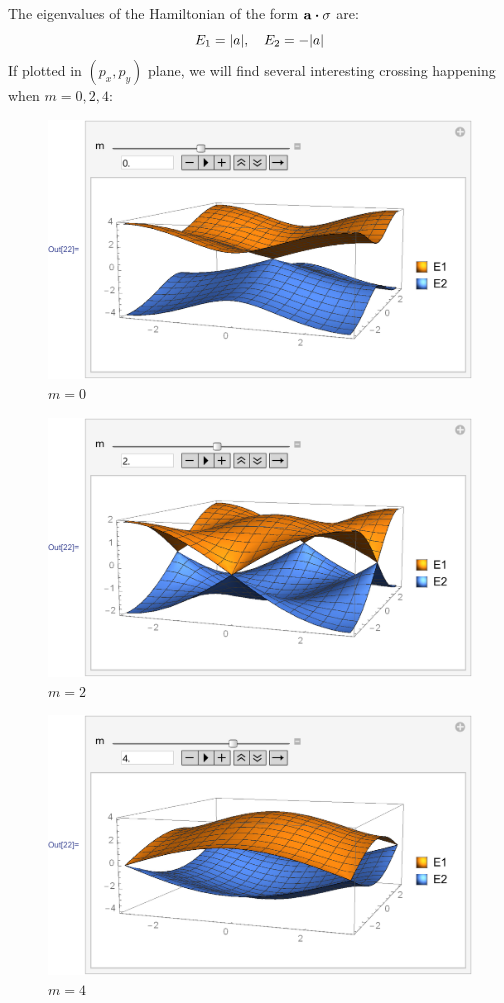 \documentclass{article}
\begin{document}
    The eigenvalues of the Hamiltonian of the form
    $\vb{a}\vdot\vb{\sigma}$ are:
    \begin{equation}
        E_1 = \abs{a},\quad E_2 = -\abs{a}
    \end{equation}
    If plotted in $(p_x,p_y)$ plane, we will find several interesting
    crossing happening when $m=0,2,4$:
    \begin{figure}[H]
        \centering
        \includegraphics[width=0.6\linewidth]{pics/OpenBC-inXY/E-m0.pdf}
        \caption{$m=0$}
    \end{figure}
    \begin{figure}[H]
        \centering
        \includegraphics[width=0.6\linewidth]{pics/OpenBC-inXY/E-m2.pdf}
        \caption{$m=2$}
    \end{figure}
    \begin{figure}[H]
        \centering
        \includegraphics[width=0.6\linewidth]{pics/OpenBC-inXY/E-m4.pdf}
        \caption{$m=4$}
    \end{figure}
\end{document}
